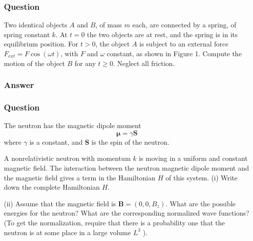 \subsubsection{Question}

Two identical objects $A$ and $B$, of mass $m$ each, are connected by a spring, of spring constant $k$. At $t = 0$ the two objects are at rest, and the spring is in its equilibrium position. For $t > 0$, the object $A$ is subject to an external force $F_{ext}= F \cos(\omega t)$, with $F$ and $\omega$ constant, as shown in Figure 1. Compute the motion of the object $B$ for any $t \ge 0$. Neglect all friction.

\subsubsection{Answer}


\subsubsection{Question}
The neutron has the magnetic dipole moment $$\boldsymbol{\mu} = \gamma \mathbf{S}$$ where $\gamma$ is a constant, and $\mathbf{S}$ is the spin of the neutron.

A nonrelativistic neutron with momentum $k$ is moving in a uniform and constant magnetic field. The interaction between the neutron magnetic dipole moment and the magnetic field gives a term in the Hamiltonian $H$ of this system. (i) Write down the complete Hamiltonian $H$.

(ii) Assume that the magnetic field is $\mathbf{B} = (0, 0, B_z)$. What are the possible energies for the neutron? What are the corresponding normalized wave functions? (To get the normalization, require that there is a probability one that the neutron is at some place in a large volume $L^3$ ).

